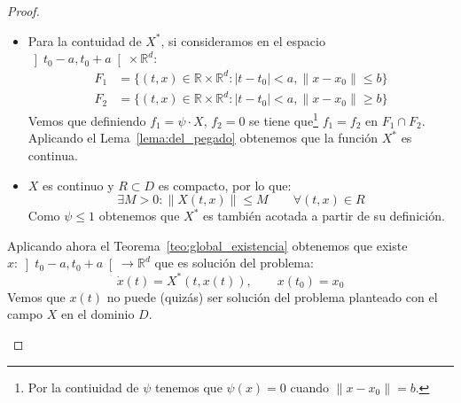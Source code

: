 \begin{prop}
\begin{proof}
        \begin{itemize}
            \item Para la contuidad de $X^\ast$, si consideramos en el espacio $\left]t_0-a,t_0+a\right[\times \mathbb{R}^d$:
                \begin{align*}
                    F_1 &= \{(t,x)\in \mathbb{R}\times \mathbb{R}^d : |t-t_0|<a, \|x-x_0\| \leq b\} \\
                    F_2 &= \{(t,x)\in \mathbb{R}\times \mathbb{R}^d : |t-t_0|<a, \|x-x_0\| \geq b\} 
                \end{align*}
                Vemos que definiendo $f_1 = \psi \cdot X$, $f_2 = 0$ se tiene que\footnote{Por la contiuidad de $\psi$ tenemos que $\psi(x) = 0$ cuando $\|x-x_0\| = b$.} $f_1 = f_2$ en $F_1\cap F_2$. Aplicando el Lema~\ref{lema:del_pegado} obtenemos que la función $X^\ast$ es continua.
            \item $X$ es continuo y $R\subset D$ es compacto, por lo que:
                \begin{equation*}
                    \exists M>0 : \|X(t,x)\|\leq M \qquad \forall (t,x)\in R
                \end{equation*}
                Como $\psi \leq 1$ obtenemos que $X^\ast$ es también acotada a partir de su definición.
        \end{itemize}
        Aplicando ahora el Teorema~\ref{teo:global_existencia} obtenemos que existe $x:\left]t_0-a,t_0+a\right[\to \mathbb{R}^d$ que es solución del problema:
        \begin{equation*}
            \dot{x}(t) = X^\ast(t,x(t)), \qquad x(t_0) = x_0
        \end{equation*} 
        Vemos que $x(t)$ no puede (quizás) ser solución del problema planteado con el campo $X$ en el dominio $D$. 
        \begin{figure}[H]
            \centering
\end{figure}
\end{proof}
\end{prop}
